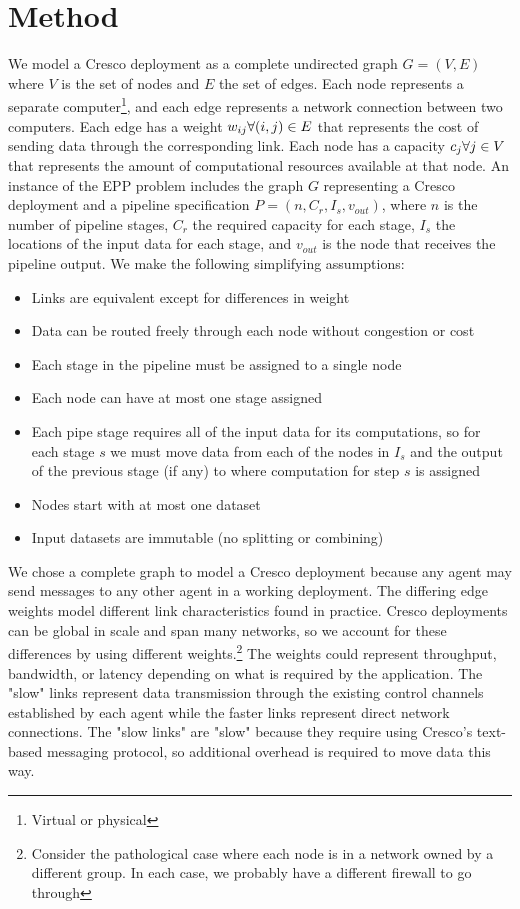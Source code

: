 \documentclass{article}
\newcommand{\forallv}[1]{\ensuremath{\forall #1 \in V}}
\newcommand{\foralle}[2]{\ensuremath{\forall (#1,#2) \in E }}
\newcommand{\eppInstance}{\ensuremath{n,C_{r},I_{s},v_{out}}}
\begin{document}
    \section{Method}
	We model a Cresco deployment as a complete undirected graph $G=(V,E)$ where $V$ is the set of nodes and $E$ the set of edges. Each node represents a separate computer\footnote{Virtual or physical}, and each edge represents a network connection between two computers. Each edge has a weight $w_{ij} \space \foralle{i}{j}$ that represents the cost of sending data through the corresponding link. Each node has a capacity $c_{j} \space \forallv{j}$ that represents the amount of computational resources available at that node. An instance of the EPP problem includes the graph $G$ representing a Cresco deployment and a pipeline specification $P = (\eppInstance)$, where  $n$ is the number of pipeline stages, $C_{r}$ the required capacity for each stage, $I_{s}$ the locations of the input data for each stage, and $v_{out}$ is the node that receives the pipeline output. We make the following simplifying assumptions:
	\begin{itemize}
		\item Links are equivalent except for differences in weight
		\item Data can be routed freely through each node without congestion or cost
		\item Each stage in the pipeline must be assigned to a single node
		\item Each node can have at most one stage assigned
		\item Each pipe stage requires all of the input data for its computations, so for each stage $s$ we must move data from each of the nodes in $I_{s}$ and the output of the previous stage (if any) to where computation for step $s$ is assigned
		\item Nodes start with at most one dataset
		\item Input datasets are immutable (no splitting or combining)
	\end{itemize}
	
	We chose a complete graph to model a Cresco deployment because any agent may send messages to any other agent in a working deployment. The differing edge weights model different link characteristics found in practice. Cresco deployments can be global in scale and span many networks, so we account for these differences by using different weights.\footnote{Consider the pathological case where each node is in a network owned by a different group. In each case, we probably have a different firewall to go through} The weights could represent throughput, bandwidth, or latency depending on what is required by the application. The "slow" links represent data transmission through the existing control channels established by each agent while the faster links represent direct network connections. The "slow links" are "slow" because they require using Cresco's text-based messaging protocol, so additional overhead is required to move data this way.
	
\end{document}
